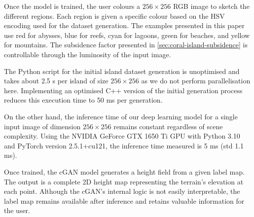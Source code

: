 Once the model is trained, the user colours a $256\times256$ RGB image to sketch the different regions. Each region is given a specific colour based on the HSV encoding used for the dataset generation. The examples presented in this paper use red for abysses, blue for reefs, cyan for lagoons, green for beaches, and yellow for mountains. The subsidence factor presented in \cref{sec:coral-island-subsidence} is controllable through the luminosity of the input image.

The Python script for the initial island dataset generation is unoptimised and takes about 2.5 s per island of size $256 \times 256$ as we do not perform parallelisation here. Implementing an optimised C++ version of the initial generation process reduces this execution time to 50 ms per generation.

On the other hand, the inference time of our deep learning model for a single input image of dimension $256 \times 256$ remains constant regardless of scene complexity. Using the NVIDIA GeForce GTX 1650 Ti GPU with Python 3.10 and PyTorch version 2.5.1+cu121, the inference time measured is 5 ms (std 1.1 ms).


Once trained, the cGAN model generates a height field from a given label map. The output is a complete 2D height map representing the terrain's elevation at each point. Although the cGAN's internal logic is not easily interpretable, the label map remains available after inference and retains valuable information for the user.



